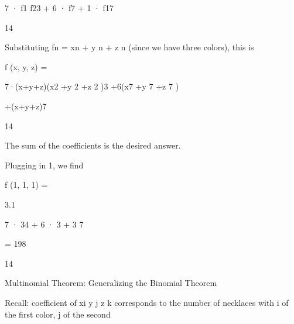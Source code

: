 \documentclass[a4paper,portrait,12pt]{article}
\begin{document}
\begin{flushleft}
7 · f1 f23 + 6 · f7 + 1 · f17
\end{flushleft}


14


\begin{flushleft}
Substituting fn = xn + y n + z n (since we have three colors), this is
\end{flushleft}


\begin{flushleft}
f (x, y, z) =
\end{flushleft}





\begin{flushleft}
7·(x+y+z)(x2 +y 2 +z 2 )3 +6(x7 +y 7 +z 7 )
\end{flushleft}


\begin{flushleft}
+(x+y+z)7
\end{flushleft}





14





\begin{flushleft}
The sum of the coefficients is the desired answer.
\end{flushleft}


\begin{flushleft}
Plugging in 1, we find
\end{flushleft}


\begin{flushleft}
f (1, 1, 1) =
\end{flushleft}





3.1





7 · 34 + 6 · 3 + 3 7


= 198


14





\begin{flushleft}
Multinomial Theorem: Generalizing the Binomial Theorem
\end{flushleft}





\begin{flushleft}
Recall: coefficient of xi y j z k corresponds to the number of necklaces with i of the first color, j of the second
\end{flushleft}
\end{document}
